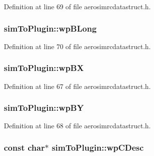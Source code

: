 Definition at line 69 of file aerosimrcdatastruct.\-h.

\hypertarget{group___aero_sim_r_c_ga00083d7085ddb6c0cd1b432f5338d7d5}{
\subsubsection[{wp\-B\-Long}]{ sim\-To\-Plugin\-::wp\-B\-Long}}\label{group___aero_sim_r_c_ga00083d7085ddb6c0cd1b432f5338d7d5}


Definition at line 70 of file aerosimrcdatastruct.\-h.

\hypertarget{group___aero_sim_r_c_gaf7735ebc4b357abc63f8b409da005e65}{
\subsubsection[{wp\-B\-X}]{ sim\-To\-Plugin\-::wp\-B\-X}}\label{group___aero_sim_r_c_gaf7735ebc4b357abc63f8b409da005e65}


Definition at line 67 of file aerosimrcdatastruct.\-h.

\hypertarget{group___aero_sim_r_c_ga940744eca5513d5b45725bad868231e5}{
\subsubsection[{wp\-B\-Y}]{ sim\-To\-Plugin\-::wp\-B\-Y}}\label{group___aero_sim_r_c_ga940744eca5513d5b45725bad868231e5}


Definition at line 68 of file aerosimrcdatastruct.\-h.

\hypertarget{group___aero_sim_r_c_gaac6ce2f906c7743fd06d88ed1e63f8d1}{
\subsubsection[{wp\-C\-Desc}]{\setlength{\rightskip}{0pt plus 5cm}const char$\ast$ sim\-To\-Plugin\-::wp\-C\-Desc}}\label{group___aero_sim_r_c_gaac6ce2f906c7743fd06d88ed1e63f8d1}


